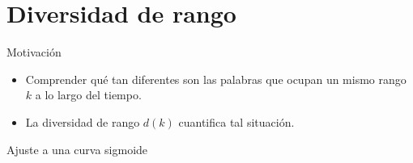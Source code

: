 \documentclass[10pt,xcolor={usenames,dvipsnames}]{beamer}
\begin{document}
\section{Diversidad de rango}

\begin{frame}{Motivación}
	\begin{itemize}
	\item<1->[$\blacksquare$] Comprender qué tan diferentes son las palabras que ocupan un mismo rango $k$ a lo largo del tiempo.
	\vspace{5mm}
	\item<2->[$\blacksquare$]La diversidad de rango $d(k)$ cuantifica tal situación. 
	\end{itemize}
\end{frame}


%	
%


\begin{frame}{Ajuste a una curva sigmoide}
		\begin{columns}
	\end{columns}
	
\end{frame}
\end{document}

